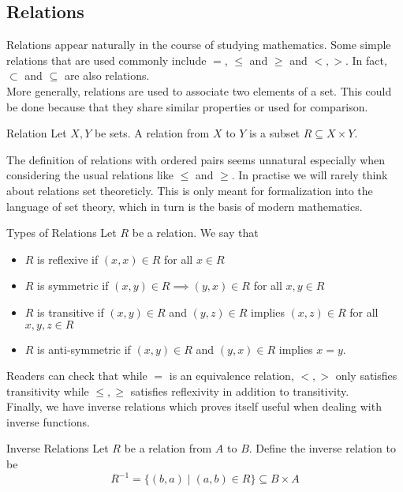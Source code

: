 \documentclass[a4paper]{article}
\begin{document}
\subsection{Relations}
Relations appear naturally in the course of studying mathematics. Some simple relations that are used commonly include $=$, $\leq$ and $\geq$ and $<,>$. In fact, $\subset$ and $\subseteq$ are also relations. \\
More generally, relations are used to associate two elements of a set. This could be done because that they share similar properties or used for comparison. 

\begin{defn}{Relation}{} Let $X,Y$ be sets. A relation from $X$ to $Y$ is a subset $R\subseteq X\times Y$. 
\end{defn}

The definition of relations with ordered pairs seems unnatural especially when considering the usual relations like $\leq$ and $\geq$. In practise we will rarely think about relations set theoreticly. This is only meant for formalization into the language of set theory, which in turn is the basis of modern mathematics. 

\begin{defn}{Types of Relations}{} Let $R$ be a relation. We say that 
\begin{itemize}
\item $R$ is reflexive if $(x,x)\in R$ for all $x\in R$
\item $R$ is symmetric if $(x,y)\in R\implies (y,x)\in R$ for all $x,y\in R$
\item $R$ is transitive if $(x,y)\in R$ and $(y,z)\in R$ implies $(x,z)\in R$ for all $x,y,z\in R$
\item $R$ is anti-symmetric if $(x,y)\in R$ and $(y,x)\in R$ implies $x=y$. 
\end{itemize}
\end{defn}

Readers can check that while $=$ is an equivalence relation, $<,>$ only satisfies transitivity while $\leq,\geq$ satisfies reflexivity in addition to transitivity. \\

Finally, we have inverse relations which proves itself useful when dealing with inverse functions. 

\begin{defn}{Inverse Relations}{} Let $R$ be a relation from $A$ to $B$. Define the inverse relation to be $$R^{-1}=\{(b,a)\;|\;(a,b)\in R\}\subseteq B\times A$$
\end{defn}
\end{document}
